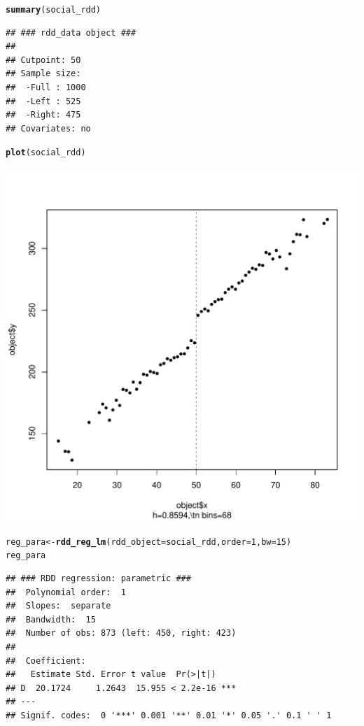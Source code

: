 \documentclass[12pt]{article}\usepackage[]{graphicx}\usepackage[]{color}
\makeatletter
\def\maxwidth{ %
  \ifdim\Gin@nat@width>\linewidth
    \linewidth
  \else
    \Gin@nat@width
  \fi
}
\newcommand{\hlnum}[1]{\textcolor[rgb]{0.686,0.059,0.569}{#1}}%
\newcommand{\hlstd}[1]{\textcolor[rgb]{0.345,0.345,0.345}{#1}}%
\newcommand{\hlkwb}[1]{\textcolor[rgb]{0.69,0.353,0.396}{#1}}%
\newcommand{\hlkwc}[1]{\textcolor[rgb]{0.333,0.667,0.333}{#1}}%
\newcommand{\hlkwd}[1]{\textcolor[rgb]{0.737,0.353,0.396}{\textbf{#1}}}%
\newenvironment{kframe}{%
 \def\at@end@of@kframe{}%
 \ifinner\ifhmode%
  \def\at@end@of@kframe{\end{minipage}}%
  \begin{minipage}{\columnwidth}%
 \fi\fi%
 \def\FrameCommand##1{\hskip\@totalleftmargin \hskip-\fboxsep
 \colorbox{shadecolor}{##1}\hskip-\fboxsep
     \hskip-\linewidth \hskip-\@totalleftmargin \hskip\columnwidth}%
 \MakeFramed {\advance\hsize-\width
   \@totalleftmargin\z@ \linewidth\hsize
   \@setminipage}}%
 {\par\unskip\endMakeFramed%
 \at@end@of@kframe}
\newenvironment{knitrout}{}{} %
\makeatother
\begin{document}
\begin{knitrout}
\begin{kframe}
\begin{alltt}
\hlkwd{summary}\hlstd{(social_rdd)}
\end{alltt}
\begin{verbatim}
## ### rdd_data object ###
## 
## Cutpoint: 50 
## Sample size: 
## 	-Full : 1000 
## 	-Left : 525 
## 	-Right: 475
## Covariates: no
\end{verbatim}
\begin{alltt}
\hlkwd{plot}\hlstd{(social_rdd)}
\end{alltt}
\end{kframe}
\includegraphics[width=\maxwidth]{figure/unnamed-chunk-11-1} 
\begin{kframe}\begin{alltt}
\hlstd{reg_para} \hlkwb{<-} \hlkwd{rdd_reg_lm}\hlstd{(}\hlkwc{rdd_object} \hlstd{= social_rdd,} \hlkwc{order} \hlstd{=} \hlnum{1}\hlstd{,} \hlkwc{bw} \hlstd{=} \hlnum{15}\hlstd{)}
\hlstd{reg_para}
\end{alltt}
\begin{verbatim}
## ### RDD regression: parametric ###
## 	Polynomial order:  1 
## 	Slopes:  separate 
## 	Bandwidth:  15 
## 	Number of obs: 873 (left: 450, right: 423)
## 
## 	Coefficient:
##   Estimate Std. Error t value  Pr(>|t|)    
## D  20.1724     1.2643  15.955 < 2.2e-16 ***
## ---
## Signif. codes:  0 '***' 0.001 '**' 0.01 '*' 0.05 '.' 0.1 ' ' 1
\end{verbatim}

\end{kframe}
\end{knitrout}
\end{document}
